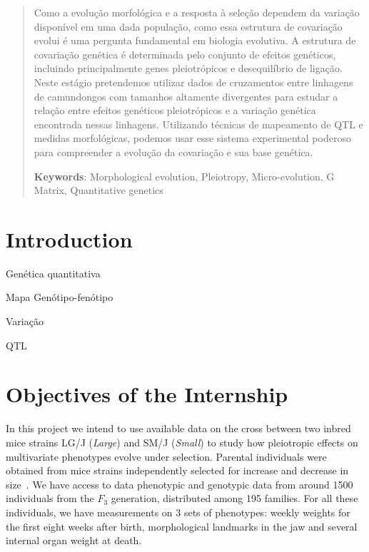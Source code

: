 \documentclass[twoside,a4paper,12pt]{article}
\begin{document}
\begin{abstract}

Como a evolução morfológica e a resposta à seleção dependem da
variação disponível em uma dada população, como essa estrutura de
covariação evolui é uma pergunta fundamental em biologia evolutiva.
A estrutura de covariação genética é determinada pelo conjunto
de efeitos genéticos, incluindo principalmente genes pleiotrópicos
e desequilíbrio de ligação. Neste estágio pretendemos utilizar
dados de cruzamentos entre linhagens de camundongos com tamanhos
altamente divergentes para estudar a relação entre efeitos genéticos
pleiotrópicos e a variação genética encontrada nessas linhagens.
Utilizando técnicas de mapeamento de QTL e medidas morfológicas,
podemos usar esse sistema experimental poderoso para compreender a
evolução da covariação e sua base genética.


\textbf{Keywords}: Morphological evolution, Pleiotropy, Micro-evolution, G Matrix, Quantitative genetics
\end{abstract}

\tableofcontents

\thispagestyle{empty}
\newpage

\pagestyle{plain}
\onehalfspacing
\setcounter{page}{1}

\section{Introduction}

Genética quantitativa

Mapa Genótipo-fenótipo

Variação

QTL

\section{Objectives of the Internship}

In this project we intend to use available data on the cross
between two inbred mice strains LG/J ({\it Large\/}) and SM/J
({\it Small\/}) to study how pleiotropic effects on multivariate
phenotypes evolve under selection. Parental individuals were obtained
from mice strains independently selected for increase and decrease
in size~\citep{MacArthur1944, Goodale1938}. We have access to data
phenotypic and genotypic data from around 1500 individuals from the
$F_3$ generation, distributed among 195 families. For all these
individuals, we have measurements on 3 sets of phenotypes: weekly weights
for the first eight weeks after birth, morphological landmarks in the
jaw and several internal organ weight at death.
\end{document}
